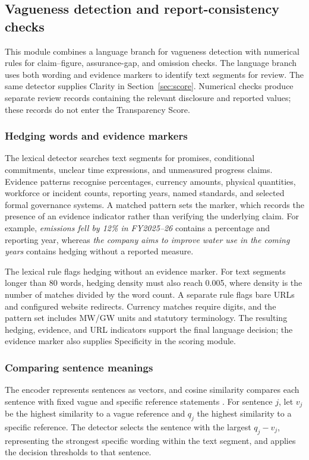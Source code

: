 \subsection{Vagueness detection and report-consistency checks}
\label{sec:detector}

This module combines a language branch for vagueness detection with numerical rules for claim--figure, assurance-gap, and omission checks. The language branch uses both wording and evidence markers to identify text segments for review. The same detector supplies Clarity in Section~\ref{sec:score}. Numerical checks produce separate review records containing the relevant disclosure and reported values; these records do not enter the Transparency Score.

\subsubsection{Hedging words and evidence markers}

The lexical detector searches text segments for promises, conditional commitments, unclear time expressions, and unmeasured progress claims. Evidence patterns recognise percentages, currency amounts, physical quantities, workforce or incident counts, reporting years, named standards, and selected formal governance systems. A matched pattern sets the  marker, which records the presence of an evidence indicator rather than verifying the underlying claim. For example, \emph{emissions fell by 12\% in FY2025--26} contains a percentage and reporting year, whereas \emph{the company aims to improve water use in the coming years} contains hedging without a reported measure.

The lexical rule flags hedging without an evidence marker. For text segments longer than 80 words, hedging density must also reach 0.005, where density is the number of matches divided by the word count. A separate rule flags bare URLs and configured website redirects. Currency matches require digits, and the pattern set includes MW/GW units and statutory terminology. The resulting hedging, evidence, and URL indicators support the final language decision; the evidence marker also supplies Specificity in the scoring module.

\subsubsection{Comparing sentence meanings}

The  encoder represents sentences as vectors, and cosine similarity compares each sentence with fixed vague and specific reference statements \cite{reimers2019,song2020}. For sentence $j$, let $v_j$ be the highest similarity to a vague reference and $q_j$ the highest similarity to a specific reference. The detector selects the sentence with the largest $q_j-v_j$, representing the strongest specific wording within the text segment, and applies the decision thresholds to that sentence.

